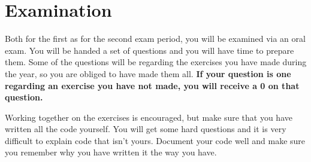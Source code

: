 \section{Examination}
Both for the first as for the second exam period, you will be examined via an oral exam.
You will be handed a set of questions and  you will have time to prepare them.
Some of the questions will be regarding the exercises you have made during the year, so you are obliged to have made them all.
\textbf{If your question is one regarding an exercise you have not made, you will receive a 0 on that question.}

Working together on the exercises is encouraged, but make sure that you have written all the code yourself.
You will get some hard questions and it is very difficult to explain code that isn't yours.
Document your code well and make sure you remember why you have written it the way you have.


